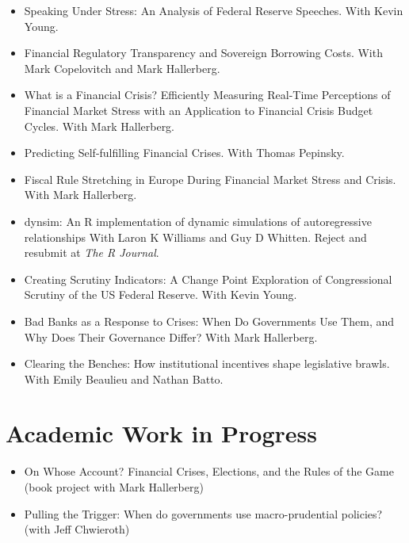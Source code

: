\documentclass[a4paper]{article}
\begin{document}
{\begin{itemize}
    \item Speaking Under Stress: An Analysis of Federal Reserve Speeches. With Kevin Young.

    \item Financial Regulatory Transparency and Sovereign Borrowing Costs. With Mark Copelovitch and Mark Hallerberg.

    \item What is a Financial Crisis? Efficiently Measuring Real-Time Perceptions of Financial Market Stress with an Application to Financial Crisis Budget Cycles. With Mark Hallerberg.

    \item Predicting Self-fulfilling Financial Crises. With Thomas Pepinsky.

    \item Fiscal Rule Stretching in Europe During Financial Market Stress and Crisis. With Mark Hallerberg.

    \item dynsim: An R implementation of dynamic simulations of autoregressive relationships With Laron K Williams and Guy D Whitten. Reject and resubmit at \emph{The R Journal}.

    \item Creating Scrutiny Indicators: A Change Point Exploration of Congressional Scrutiny of the US Federal Reserve. With Kevin Young.

    \item Bad Banks as a Response to Crises: When Do Governments Use Them, and Why Does Their Governance Differ? With Mark Hallerberg.

    \item Clearing the Benches: How institutional incentives shape legislative brawls. With Emily Beaulieu and Nathan Batto.

\end{itemize}

\section*{Academic Work in Progress}

\begin{itemize}

    \item On Whose Account? Financial Crises, Elections, and the Rules of the Game (book project with Mark Hallerberg)

    \item Pulling the Trigger: When do governments use macro-prudential policies? (with Jeff Chwieroth)


\end{itemize}}
\end{document}
